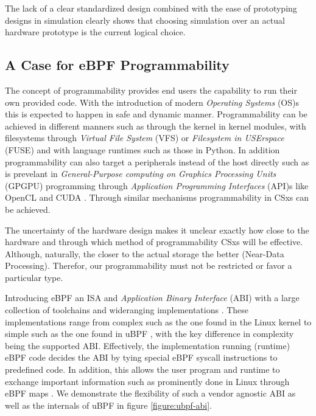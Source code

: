 The lack of a clear standardized design combined with the ease of prototyping
designs in simulation clearly shows that choosing simulation over an actual
hardware prototype is the current logical choice.

\subsection{A Case for eBPF Programmability}

The concept of programmability provides end users the capability to run their
own provided code. With the introduction of modern \textit{Operating Systems}
(OS)s this is expected to happen in safe and dynamic manner. Programmability
can be achieved in different manners such as through the kernel in kernel
modules, with filesystems through \textit{Virtual File System} (VFS) or
\textit{Filesystem in USErspace} (FUSE) and with language runtimes such as those
in Python. In addition programmability can also target a peripherals instead of
the host directly such as is prevelant in \textit{General-Purpose computing on
Graphics Processing Units} (GPGPU) programming through \textit{Application
Programming Interfaces} (API)s like OpenCL \cite{opencl} and CUDA \cite{cuda}.
Through similar mechanisms programmability in CSxs can be achieved.

The uncertainty of the hardware design makes it unclear exactly how close to the
hardware and through which method of programmability CSxs will be effective.
Although, naturally, the closer to the actual storage the better
(Near-Data Processing). Therefor, our programmability must not be restricted or
favor a particular type.

Introducing eBPF an ISA and \textit{Application Binary Interface} (ABI) with a
large collection of toolchains and wideranging implementations
\cite{what-ebpf, McCanne1993TheBP}. These implementations range from complex
such as the one found in the Linux kernel to simple such as the one found in
uBPF \cite{ubpf}, with the key difference in complexity being the supported ABI.
Effectively, the implementation running (runtime) eBPF code decides the ABI by
tying special eBPF syscall instructions to predefined code. In addition, this
allows the user program and runtime to exchange important information such as
prominently done in Linux through eBPF maps \cite{bpf-man}. We demonstrate the
flexibility of such a vendor agnostic ABI as well as the internals of uBPF in
figure \ref{figure:ubpf-abi}.

